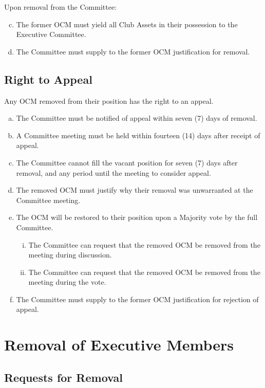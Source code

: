 \documentclass[a4paper,12pt]{article}
\begin{document}
Upon removal from the Committee:

\begin{enumerate}[a)]
	\setcounter{enumi}{2}
	\item The former OCM must yield all Club Assets in their possession to the Executive Committee.
	\item The Committee must supply to the former OCM justification for removal.
\end{enumerate}

\subsection{Right to Appeal}

Any OCM removed from their position has the right to an appeal.

\begin{enumerate}[a)]
	\item The Committee must be notified of appeal within seven (7) days of removal.
	\item A Committee meeting must be held within fourteen (14) days after receipt of appeal.
	\item The Committee cannot fill the vacant position for seven (7) days after removal, and any period until the meeting to consider appeal.
	\item The removed OCM must justify why their removal was unwarranted at the Committee meeting.
	\item The OCM will be restored to their position upon a Majority vote by the full Committee.
	\begin{enumerate}[i)]
		\item The Committee can request that the removed OCM be removed from the meeting during discussion.
		\item The Committee can request that the removed OCM be removed from the meeting during the vote.
	\end{enumerate}
	\item The Committee must supply to the former OCM justification for rejection of appeal.
\end{enumerate}

\section{Removal of Executive Members}

\subsection{Requests for Removal}
\end{document}
